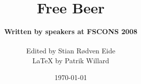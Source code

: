 \documentclass[a4paper,11pt,titlepage]{book}
\begin{document}
 
    \title{\Huge{Free Beer}}
    \author{\textbf{Written by speakers at FSCONS 2008}\\\\ Edited by Stian Rødven Eide\\ \LaTeX{} by Patrik Willard}
    \date{\today}


    \addtolength{\oddsidemargin}{0.85cm}
    \maketitle
    \addtolength{\oddsidemargin}{-0.85cm}

    \pagestyle{empty}
    
    \tableofcontents
    \newpage

    \mainmatter
    \pagestyle{plain}
    

    \newpage
    \appendix
    

    \backmatter
    
    
    

    \newpage
    \mbox{}
    \thispagestyle{empty}
\end{document}
